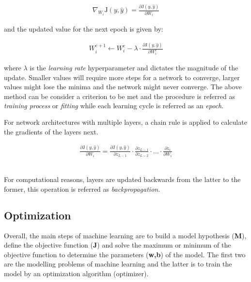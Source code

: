 \begin{ceqn}
\begin{align}
    \nabla_{W_i}\text{J}(y, \hat{y}) = \frac{\partial\text{J}(y, \hat{y})}{\partial W_i}
\end{align}  
\end{ceqn}

and the updated value for the next epoch is given by:

\begin{ceqn}
\begin{align}
  W_{i}^{e+1} \leftarrow W_{i}^{e} - \lambda \cdot \frac{\partial\text{J}(y, \hat{y})}{\partial W_{i}^{e}}
\end{align}  
\end{ceqn}

where $\lambda$ is the \textit{learning rate} hyperparameter and dictates the magnitude of the update. Smaller values will require more steps for a network to converge, larger values might lose the minima and the network might never converge.
The above method can be consider a criterion to be met and the procedure is referred as \textit{training process} or \textit{fitting} while each learning cycle is referred as an \textit{epoch}.

For network architectures with multiple layers, a chain rule is applied to calculate the gradients of the layers next.

\begin{ceqn}
\begin{align}
    \frac{\partial\text{J}(y, \hat{y})}{\partial W_{i}} = \frac{\partial\text{J}(y, \hat{y})}{\partial z_{L-1}} \cdot \frac{\partial z_{L-1}}{\partial z_{L-2}} \cdot  \ldots  \cdot \frac{\partial z_{i}}{\partial W_{i}}
\end{align}  
\end{ceqn}
\\
For computational reasons, layers are updated backwards from the latter to the former, this operation is referred as \textit{backpropagation}.

\subsection{Optimization}

Overall, the main steps of machine learning are to build a model hypothesis (\textbf{M}), define the objective function (\textbf{J}) and solve the maximum or minimum of the objective function to determine the parameters (\textbf{w,b}) of the model.
The first two are the modelling problems of machine learning and the latter is to train the model by an optimization algorithm (optimizer).

